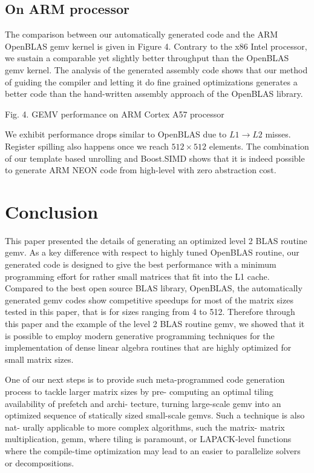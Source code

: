 \documentclass[../../main.tex]{subfiles}
\begin{document}
\subsection{On ARM processor}

The comparison between our automatically generated code
and the ARM OpenBLAS gemv kernel is given in Figure 4.
Contrary to the x86 Intel processor, we sustain a comparable
yet slightly better throughput than the OpenBLAS gemv
kernel. The analysis of the generated assembly code shows
that our method of guiding the compiler and letting it do
fine grained optimizations generates a better code than the
hand-written assembly approach of the OpenBLAS library.

Fig. 4. GEMV performance on ARM Cortex A57 processor

We exhibit performance drops similar to OpenBLAS due to
$L1 \rightarrow L2$ misses. Register spilling also happens once we reach
$512 \times 512$ elements. The combination of our template based
unrolling and Boost.SIMD shows that it is indeed possible to
generate ARM NEON code from high-level \cpp with zero
abstraction cost.

\section{Conclusion}

This paper presented the details of generating an optimized
level 2 BLAS routine gemv. As a key difference with respect
to highly tuned OpenBLAS routine, our generated code
is designed to give the best performance with a minimum
programming effort for rather small matrices that fit into the
L1 cache. Compared to the best open source BLAS library,
OpenBLAS, the automatically generated gemv codes show
competitive speedups for most of the matrix sizes tested in
this paper, that is for sizes ranging from 4 to 512. Therefore
through this paper and the example of the level 2 BLAS
routine gemv, we showed that it is possible to employ modern
generative programming techniques for the implementation
of dense linear algebra routines that are highly optimized for
small matrix sizes.

One of our next steps is to provide such meta-programmed
code generation process to tackle larger matrix sizes by pre-
computing an optimal tiling availability of prefetch and archi-
tecture, turning large-scale gemv into an optimized sequence of
statically sized small-scale gemvs. Such a technique is also nat-
urally applicable to more complex algorithms, such the matrix-
matrix multiplication, gemm, where tiling is paramount, or
LAPACK-level functions where the compile-time optimization
may lead to an easier to parallelize solvers or decompositions.
\end{document}
